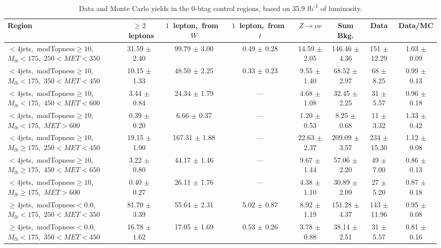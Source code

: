 \begin{table}
\centering
\scriptsize
\caption{Data and Monte Carlo yields in the 0-btag control regions,
  based on 35.9 fb\textsuperscript{-1} of luminosity.}
\label{tab:stop:1lw:cryields}
\begin{tabular}{|l|c c c c c|c|c|}
\hline
Region  & $\ge2$~leptons & $1$~lepton,~from~$W$ & $1$~lepton,~from~$t$ & $Z\rightarrow\nu\nu$ & Sum Bkg. & Data & Data/MC \\*
\hline \hline
$<4$jets,~modTopness$\ge10$,~$M_{lb}<175$,~$250<MET<350$        & 31.59 $\pm$ 2.40 & 99.79 $\pm$ 3.00  & 0.49 $\pm$ 0.28 & 14.59 $\pm$ 2.05 & 146.46 $\pm$ 4.36 & 151 $\pm$ 12.29 & 1.03 $\pm$ 0.09 \\
$<4$jets,~modTopness$\ge10$,~$M_{lb}<175$,~$350<MET<450$        & 10.15 $\pm$ 1.33 & 48.50 $\pm$ 2.25  & 0.33 $\pm$ 0.23 & 9.55 $\pm$ 1.40  & 68.52 $\pm$ 2.97  & 68 $\pm$ 8.25   & 0.99 $\pm$ 0.13 \\
$<4$jets,~modTopness$\ge10$,~$M_{lb}<175$,~$450<MET<600$        & 3.44 $\pm$ 0.84  & 24.34 $\pm$ 1.79  &       ---       & 4.68 $\pm$ 1.08  & 32.45 $\pm$ 2.25  & 31 $\pm$ 5.57   & 0.96 $\pm$ 0.18 \\
$<4$jets,~modTopness$\ge10$,~$M_{lb}<175$,~$MET>600$            & 0.39 $\pm$ 0.20  & 6.66 $\pm$ 0.37   &       ---       & 1.20 $\pm$ 0.53  & 8.25 $\pm$ 0.68   & 11 $\pm$ 3.32   & 1.33 $\pm$ 0.42 \\
\hline
$<4$jets,~modTopness$\ge10$,~$M_{lb}\ge175$,~$250<MET<450$      & 19.15 $\pm$ 1.90 & 167.31 $\pm$ 1.88 &       ---       & 22.63 $\pm$ 2.37 & 209.09 $\pm$ 3.57 & 234 $\pm$ 15.30 & 1.12 $\pm$ 0.08 \\
$<4$jets,~modTopness$\ge10$,~$M_{lb}\ge175$,~$450<MET<650$      & 3.22 $\pm$ 0.80  & 44.17 $\pm$ 1.46  &       ---       & 9.67 $\pm$ 1.44  & 57.06 $\pm$ 2.20  & 49 $\pm$ 7.00   & 0.86 $\pm$ 0.13 \\
$<4$jets,~modTopness$\ge10$,~$M_{lb}\ge175$,~$MET>600$          & 0.40 $\pm$ 0.27  & 26.11 $\pm$ 1.76  &       ---       & 4.38 $\pm$ 1.10  & 30.89 $\pm$ 2.09  & 27 $\pm$ 5.20   & 0.87 $\pm$ 0.18 \\
\hline
$\ge4$jets,~modTopness$<0.0$,~$M_{lb}<175$,~$250<MET<350$       & 81.70 $\pm$ 3.39 & 55.64 $\pm$ 2.31  & 5.02 $\pm$ 0.87 & 8.92 $\pm$ 1.19  & 151.28 $\pm$ 4.37 & 143 $\pm$ 11.96 & 0.95 $\pm$ 0.08 \\
$\ge4$jets,~modTopness$<0.0$,~$M_{lb}<175$,~$350<MET<450$       & 16.78 $\pm$ 1.62 & 17.05 $\pm$ 1.69  & 0.53 $\pm$ 0.26 & 3.78 $\pm$ 0.88  & 38.14 $\pm$ 2.51  & 31 $\pm$ 5.57   & 0.81 $\pm$ 0.16 \\

\end{tabular}
\end{table}
